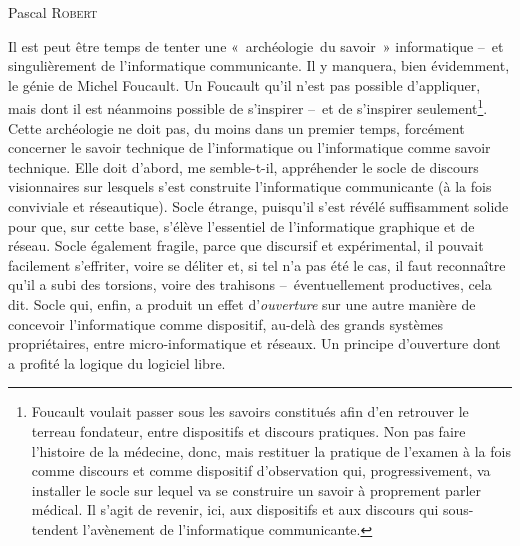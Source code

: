 \documentclass{FramateX}
\begin{document}
\begin{refsection}

\begin{flushright}
Pascal \textsc{Robert}
\end{flushright}
\vspace{10 mm}

Il est peut être temps de tenter une «~archéologie~du savoir~»
informatique –~et singulièrement de l'informatique communicante. Il y
manquera, bien évidemment, le génie de Michel Foucault. Un Foucault qu'il
n'est pas possible d'appliquer, mais dont il est néanmoins possible de
s'inspirer –~et de s'inspirer seulement\footnote{Foucault voulait
passer sous les savoirs constitués afin d'en retrouver le terreau
fondateur, entre dispositifs et discours pratiques. Non pas faire
l'histoire de la médecine, donc, mais restituer la pratique de l'examen
à la fois comme discours et comme dispositif d'observation qui,
progressivement, va installer le socle sur lequel va se construire un
savoir à proprement parler médical. Il s'agit de revenir, ici, aux
dispositifs et aux discours qui sous-tendent l'avènement de
l'informatique communicante.}. Cette archéologie ne doit pas, du moins
dans un premier temps, forcément concerner le savoir technique de
l'informatique ou l'informatique comme savoir technique. Elle doit
d'abord, me semble-t-il, appréhender le socle de discours visionnaires
sur lesquels s'est construite l'informatique communicante (à la fois
conviviale et réseautique). Socle étrange, puisqu'il s'est révélé
suffisamment solide pour que, sur cette base, s'élève l'essentiel de
l'informatique graphique et de réseau. Socle également fragile, parce
que discursif et expérimental, il pouvait facilement s'effriter, voire
se déliter et, si tel n'a pas été le cas, il faut reconnaître qu'il a
subi des torsions, voire des trahisons –~éventuellement productives,
cela dit. Socle qui, enfin, a produit un effet d'\textit{ouverture} sur
une autre manière de concevoir l'informatique comme dispositif, au-delà
des grands systèmes propriétaires, entre micro-informatique et réseaux.
Un principe d'ouverture dont a profité la logique du logiciel libre.



\end{refsection}
\end{document}

